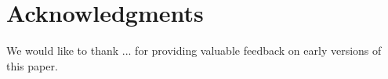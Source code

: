 \section{Acknowledgments} 

We would like to thank ... for providing valuable feedback on
early versions of this paper.
